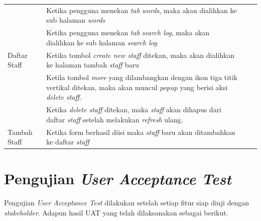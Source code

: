 \begin{longtable}{@{}|p{3cm}|p{6cm}|p{2.5cm}|p{2.5cm}|@{}}
	\cline{2-4}
	& Ketika pengguna menekan \textit{tab} \textit{words}, maka akan dialihkan ke sub halaman \textit{words} &\checkmark& \\
	\cline{2-4}		
	& Ketika pengguna menekan \textit{tab} \textit{search log}, maka akan dialihkan ke sub halaman \textit{search log} &\checkmark& \\
	\hline
	Daftar Staff & Ketika tombol \textit{create new staff} ditekan, maka akan dialihkan ke halaman tambah \textit{staff} baru &\checkmark& \\
	\cline{2-4}
	&  Ketila tombol \textit{more} yang dilambangkan dengan ikon tiga titik vertikal ditekan, maka akan muncul \textit{popup} yang berisi aksi \textit{delete staff}. &\checkmark& \\
	\cline{2-4}
	& Ketika \textit{delete staff} ditekan, maka \textit{staff} akan dihapus dari daftar \textit{staff} setelah melakukan \textit{refresh} ulang. &\checkmark& \\
	\hline
	Tambah Staff & Ketika form berhasil diisi maka \textit{staff} baru akan ditambahkan ke daftar \textit{staff} &\checkmark& \\
	\hline
\end{longtable}


\section{Pengujian \textit{User Acceptance Test}}

Pengujian \textit{User Acceptance Test} dilakukan setelah setiap fitur siap diuji dengan \textit{stakeholder}. Adapun hasil UAT yang telah dilaksanakan sebagai berikut.

